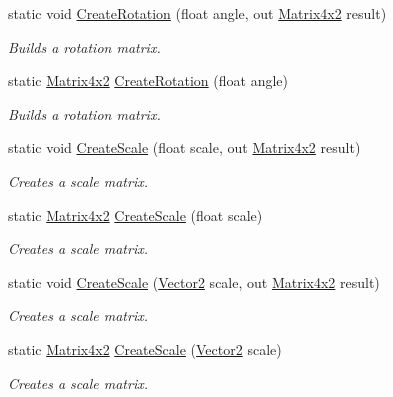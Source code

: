 \begin{DoxyCompactItemize}
\item 
static void \hyperlink{struct_open_t_k_1_1_matrix4x2_a6bf4bcc0a5178b8c99ed90c8adac3903}{Create\-Rotation} (float angle, out \hyperlink{struct_open_t_k_1_1_matrix4x2}{Matrix4x2} result)
\begin{DoxyCompactList}\small\item\em Builds a rotation matrix. \end{DoxyCompactList}\item 
static \hyperlink{struct_open_t_k_1_1_matrix4x2}{Matrix4x2} \hyperlink{struct_open_t_k_1_1_matrix4x2_aa9538e013f306a6860bed146662418fa}{Create\-Rotation} (float angle)
\begin{DoxyCompactList}\small\item\em Builds a rotation matrix. \end{DoxyCompactList}\item 
static void \hyperlink{struct_open_t_k_1_1_matrix4x2_ab58cdcda9f7bbfb378acb868f30380f0}{Create\-Scale} (float scale, out \hyperlink{struct_open_t_k_1_1_matrix4x2}{Matrix4x2} result)
\begin{DoxyCompactList}\small\item\em Creates a scale matrix. \end{DoxyCompactList}\item 
static \hyperlink{struct_open_t_k_1_1_matrix4x2}{Matrix4x2} \hyperlink{struct_open_t_k_1_1_matrix4x2_ad63bbabbd5193dfea4af1ccbfa67a27d}{Create\-Scale} (float scale)
\begin{DoxyCompactList}\small\item\em Creates a scale matrix. \end{DoxyCompactList}\item 
static void \hyperlink{struct_open_t_k_1_1_matrix4x2_abc38abed3e6859543a0d5d2c890b1b7d}{Create\-Scale} (\hyperlink{struct_open_t_k_1_1_vector2}{Vector2} scale, out \hyperlink{struct_open_t_k_1_1_matrix4x2}{Matrix4x2} result)
\begin{DoxyCompactList}\small\item\em Creates a scale matrix. \end{DoxyCompactList}\item 
static \hyperlink{struct_open_t_k_1_1_matrix4x2}{Matrix4x2} \hyperlink{struct_open_t_k_1_1_matrix4x2_ac296743b695077975b42adfbd53f56ab}{Create\-Scale} (\hyperlink{struct_open_t_k_1_1_vector2}{Vector2} scale)
\begin{DoxyCompactList}\small\item\em Creates a scale matrix. \end{DoxyCompactList}\item 

\end{DoxyCompactItemize}
